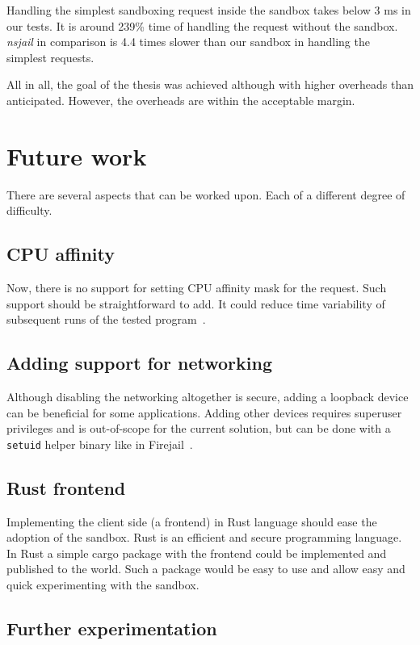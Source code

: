 \documentclass[en]{pracamgr}
\begin{document}
Handling the simplest sandboxing request inside the sandbox takes below 3 ms in our tests. It is around 239\% time of handling the request without the sandbox. \textit{nsjail} in comparison is 4.4 times slower than our sandbox in handling the simplest requests.

All in all, the goal of the thesis was achieved although with higher overheads than anticipated. However, the overheads are within the acceptable margin.

\section{Future work}\label{chapter:future_work}

There are several aspects that can be worked upon. Each of a different degree of difficulty.

\subsection{CPU affinity}

Now, there is no support for setting CPU affinity mask for the request. Such support should be straightforward to add. It could reduce time variability of subsequent runs of the tested program~\cite{merry2010performance}.

\subsection{Adding support for networking}

Although disabling the networking altogether is secure, adding a loopback device can be beneficial for some applications. Adding other devices requires superuser privileges and is out-of-scope for the current solution, but can be done with a \texttt{setuid} helper binary like in Firejail~\cite{netblue30/firejail}.

\subsection{Rust frontend}

Implementing the client side (a frontend) in Rust language should ease the adoption of the sandbox. Rust is an efficient and secure programming language. In Rust a simple cargo package with the frontend could be implemented and published to the world. Such a package would be easy to use and allow easy and quick experimenting with the sandbox.

\subsection{Further experimentation}
\end{document}
